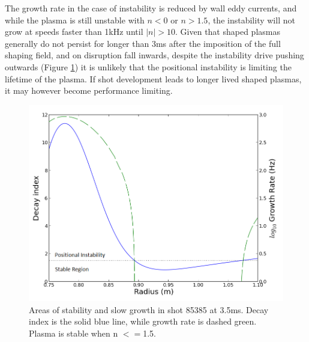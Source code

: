 \documentclass[aps,prl,twocolumn,superscriptaddress,groupedaddress]{revtex4}  %
\begin{document}
	\par The growth rate in the case of instability is reduced by wall eddy currents, and while the plasma is still unstable with $n < 0$ or $n > 1.5$, the instability will not grow at speeds faster than 1kHz until $|n| > 10$.  %
	Given that shaped plasmas generally do not persist for longer than 3ms after the imposition of the full shaping field, and on disruption fall inwards, despite the instability drive pushing outwards (Figure \ref{decay_index_and growth}) it is unlikely that the positional instability is limiting the lifetime of the plasma.  If shot development leads to longer lived shaped plasmas, it may however become performance limiting.
\begin{figure}[htb]
\centering
\includegraphics[scale=.375]{../Plots/Decay_stability_and_growth_on_midplane-edit.png}\caption{Areas of stability and slow growth in shot 85385 at 3.5ms. Decay index is the solid blue line, while growth rate is dashed green. Plasma is stable when n $<=$1.5.}
\label{decay_index_and growth}
\end{figure}
\end{document}
